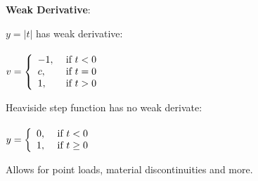 \documentclass{beamer}
\let\oldcite=\cite
\renewcommand{\cite}[1]{\textcolor[rgb]{.55,.55,.89}{\oldcite{#1}}}
\begin{document}
\begin{frame}[fragile]
\textbf{Weak Derivative}:
\vfill
\begin{minipage}{0.49\textwidth}
  $y=|t|$ has weak derivative:
  \\\\
$ v = \left\{ \begin{array} { l l }
{ - 1 , } & { \text { if } t < 0 } \\
{ c , } & { \text { if } t = 0 } \\
{ 1 , } & { \text { if } t > 0 }
\end{array} \right.$
\\

\end{minipage}
\begin{minipage}{0.4\textwidth}
\end{minipage}

\vfill
\begin{minipage}{0.49\textwidth}
  Heaviside step function has no weak derivate: \\\\
  $y= \left\{ \begin{array} { l l } { 0 , } & { \text { if } t < 0 } \\ { 1 , } & { \text { if } t \geq 0 } \end{array} \right.$
\end{minipage}
\begin{minipage}{0.4\textwidth}


\end{minipage}
\vfill
Allows for point loads, material discontinuities and more. \cite{bathe2006finite}
\end{frame}
\end{document}
